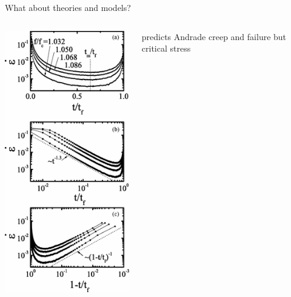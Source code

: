 \begin{frame}{What about theories and models?}
\begin{columns}
\begin{columns}
\includegraphics[width=\textwidth]{Jagla_2011_3regimes}
\end{columns}
predicts Andrade creep and failure \alert{but} critical stress
\end{columns}
\end{frame}


